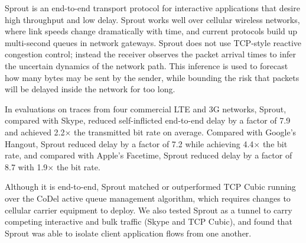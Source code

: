 Sprout is an end-to-end transport protocol for interactive
applications that desire high throughput and low delay. Sprout works
well over cellular wireless networks, where link speeds change
dramatically with time, and current protocols build up multi-second
queues in network gateways. Sprout does not use TCP-style reactive
congestion control; instead the receiver observes the packet arrival
times to infer the uncertain dynamics of the network path. This
inference is used to forecast how many bytes may be sent by the
sender, while bounding the risk that packets will be delayed inside
the network for too long.

In evaluations on traces from four commercial LTE and 3G networks,
Sprout, compared with Skype, reduced self-inflicted end-to-end delay
by a factor of 7.9 and achieved 2.2$\times$ the transmitted bit rate
on average. Compared with Google's Hangout, Sprout reduced delay by a
factor of 7.2 while achieving 4.4$\times$ the bit rate, and compared
with Apple's Facetime, Sprout reduced delay by a factor of 8.7 with
1.9$\times$ the bit rate.

Although it is end-to-end, Sprout matched or outperformed TCP Cubic
running over the CoDel active queue management algorithm, which
requires changes to cellular carrier equipment to deploy. We also
tested Sprout as a tunnel to carry competing interactive and bulk
traffic (Skype and TCP Cubic), and found that Sprout was able to isolate
client application flows from one another.
